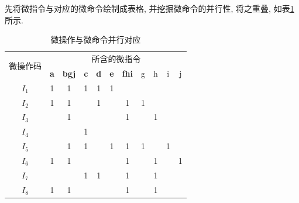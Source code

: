 \documentclass[UTF8]{report}
\newenvironment{solution}{{\noindent\hskip 2em \bf 解 \quad}}{}
\begin{document}
\begin{solution}
    先将微指令与对应的微命令绘制成表格, 并挖掘微命令的并行性, 将之重叠, 如表\ref{tab:10_21_2}所示.
    \begin{table}[htbp]
        \centering
        \caption{微操作与微命令并行对应}
        \begin{tabular}{|c|c|c|c|c|c|c|c|c|c|c|}
        \hline
        \multirow{2}[4]{*}{微操作码} & \multicolumn{10}{c|}{所含的微指令} \bigstrut\\
    \cline{2-11}      & \cellcolor[rgb]{ .867,  .851,  .769}\textbf{a} & \cellcolor[rgb]{ .867,  .851,  .769}\textbf{bgj} & \cellcolor[rgb]{ .867,  .851,  .769}\textbf{c} & \cellcolor[rgb]{ .867,  .851,  .769}\textbf{d} & \cellcolor[rgb]{ .867,  .851,  .769}\textbf{e} & \cellcolor[rgb]{ .867,  .851,  .769}\textbf{fhi} & g & h & i & j \bigstrut\\
        \hline
        $I_1$ & \cellcolor[rgb]{ 1,  1,  0}1 & \cellcolor[rgb]{ 1,  1,  0}1 & \cellcolor[rgb]{ 1,  1,  0}1 & \cellcolor[rgb]{ 1,  1,  0}1 & \cellcolor[rgb]{ 1,  1,  0}1 &   &   &   &   &  \bigstrut\\
        \hline
        $I_2$ & \cellcolor[rgb]{ 1,  1,  0}1 & \cellcolor[rgb]{ .922,  .945,  .871}1 &   & \cellcolor[rgb]{ 1,  1,  0}1 &   & \cellcolor[rgb]{ 1,  1,  0}1 & \cellcolor[rgb]{ .922,  .945,  .871}1 &   &   &  \bigstrut\\
        \hline
        $I_3$ &   & \cellcolor[rgb]{ 1,  1,  0}1 &   &   &   & \cellcolor[rgb]{ .722,  .8,  .894}1 &   & \cellcolor[rgb]{ .722,  .8,  .894}1 &   &  \bigstrut\\
        \hline
        $I_4$ &   &   & \cellcolor[rgb]{ 1,  1,  0}1 &   &   &   &   &   &   &  \bigstrut\\
        \hline
        $I_5$ &   & \cellcolor[rgb]{ .922,  .945,  .871}1 & \cellcolor[rgb]{ 1,  1,  0}1 &   & \cellcolor[rgb]{ 1,  1,  0}1 & \cellcolor[rgb]{ .992,  .914,  .851}1 & \cellcolor[rgb]{ .922,  .945,  .871}1 &   & \cellcolor[rgb]{ .992,  .914,  .851}1 &  \bigstrut\\
        \hline
        $I_6$ & \cellcolor[rgb]{ 1,  1,  0}1 & \cellcolor[rgb]{ .949,  .863,  .859}1 &   &   &   & \cellcolor[rgb]{ .722,  .8,  .894}1 &   & \cellcolor[rgb]{ .722,  .8,  .894}1 &   & \cellcolor[rgb]{ .949,  .863,  .859}1 \bigstrut\\
        \hline
        $I_7$ &   &   & \cellcolor[rgb]{ 1,  1,  0}1 & \cellcolor[rgb]{ 1,  1,  0}1 &   & \cellcolor[rgb]{ .722,  .8,  .894}1 &   & \cellcolor[rgb]{ .722,  .8,  .894}1 &   &  \bigstrut\\
        \hline
        $I_8$ & \cellcolor[rgb]{ 1,  1,  0}1 & \cellcolor[rgb]{ 1,  1,  0}1 &   &   &   & \cellcolor[rgb]{ .722,  .8,  .894}1 &   & \cellcolor[rgb]{ .722,  .8,  .894}1 &   &  \bigstrut\\
        \hline
        \end{tabular}%
        \label{tab:10_21_2}%
    \end{table}%


\end{solution}
\end{document}
